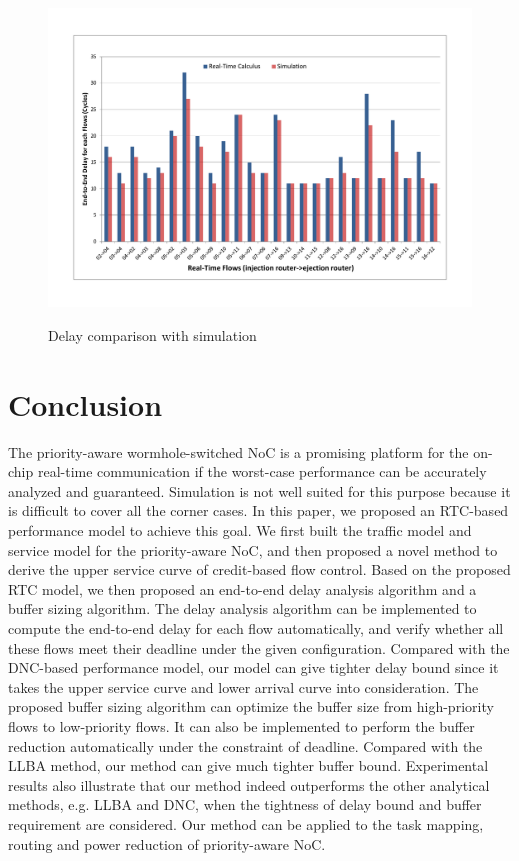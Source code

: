 \documentclass[preprint]{elsarticle}
\begin{document}
\begin{figure}
  \centering
  \includegraphics[scale=0.45]{figures/ericsson.pdf}\\
  \caption{Delay comparison with simulation}\label{ericsson}
\end{figure}

\section{Conclusion}\label{conclusion}
The priority-aware wormhole-switched NoC is a promising platform for the on-chip real-time communication if the worst-case performance can be accurately analyzed and guaranteed. Simulation is not well suited for this purpose because it is difficult to cover all the corner cases. In this paper, we proposed an RTC-based performance model to achieve this goal. We first built the traffic model and service model for the priority-aware NoC, and then proposed a novel method to derive the upper service curve of credit-based flow control. Based on the proposed RTC model, we then proposed an end-to-end delay analysis algorithm and a buffer sizing algorithm. The delay analysis algorithm can be implemented to compute the end-to-end delay for each flow automatically, and verify whether all these flows meet their deadline under the given configuration. Compared with the DNC-based performance model, our model can give tighter delay bound since it takes the upper service curve and lower arrival curve into consideration. The proposed buffer sizing algorithm can optimize the buffer size from high-priority flows to low-priority flows. It can also be implemented to perform the buffer reduction automatically under the constraint of deadline. Compared with the LLBA method, our method can give much tighter buffer bound. Experimental results also illustrate that our method indeed outperforms the other analytical methods, e.g. LLBA and DNC, when the tightness of delay bound and buffer requirement are considered. Our method can be applied to the task mapping, routing and power reduction of priority-aware NoC.
\end{document}
